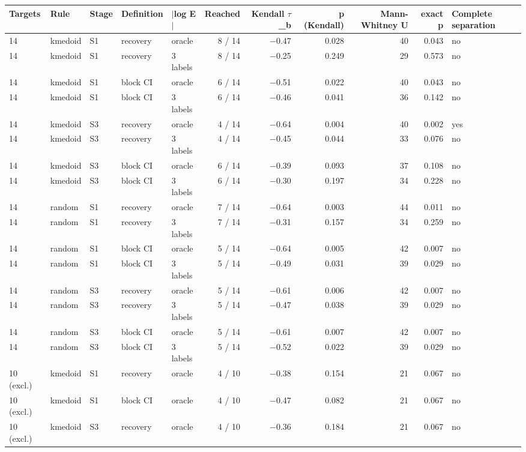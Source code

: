 \begin{tabular}{lllllrrrrrl}
\toprule
Targets & Rule & Stage & Definition & $|$log E$|$ & Reached & Kendall $\tau$\_b & p (Kendall) & Mann-Whitney U & exact p & Complete separation \\
\midrule
14 & kmedoid & S1 & recovery & oracle & 8 / 14 & $-$0.47 & 0.028 & 40 & 0.043 & no \\
14 & kmedoid & S1 & recovery & 3 labels & 8 / 14 & $-$0.25 & 0.249 & 29 & 0.573 & no \\
14 & kmedoid & S1 & block CI & oracle & 6 / 14 & $-$0.51 & 0.022 & 40 & 0.043 & no \\
14 & kmedoid & S1 & block CI & 3 labels & 6 / 14 & $-$0.46 & 0.041 & 36 & 0.142 & no \\
14 & kmedoid & S3 & recovery & oracle & 4 / 14 & $-$0.64 & 0.004 & 40 & 0.002 & yes \\
14 & kmedoid & S3 & recovery & 3 labels & 4 / 14 & $-$0.45 & 0.044 & 33 & 0.076 & no \\
14 & kmedoid & S3 & block CI & oracle & 6 / 14 & $-$0.39 & 0.093 & 37 & 0.108 & no \\
14 & kmedoid & S3 & block CI & 3 labels & 6 / 14 & $-$0.30 & 0.197 & 34 & 0.228 & no \\
14 & random & S1 & recovery & oracle & 7 / 14 & $-$0.64 & 0.003 & 44 & 0.011 & no \\
14 & random & S1 & recovery & 3 labels & 7 / 14 & $-$0.31 & 0.157 & 34 & 0.259 & no \\
14 & random & S1 & block CI & oracle & 5 / 14 & $-$0.64 & 0.005 & 42 & 0.007 & no \\
14 & random & S1 & block CI & 3 labels & 5 / 14 & $-$0.49 & 0.031 & 39 & 0.029 & no \\
14 & random & S3 & recovery & oracle & 5 / 14 & $-$0.61 & 0.006 & 42 & 0.007 & no \\
14 & random & S3 & recovery & 3 labels & 5 / 14 & $-$0.47 & 0.038 & 39 & 0.029 & no \\
14 & random & S3 & block CI & oracle & 5 / 14 & $-$0.61 & 0.007 & 42 & 0.007 & no \\
14 & random & S3 & block CI & 3 labels & 5 / 14 & $-$0.52 & 0.022 & 39 & 0.029 & no \\
10 (excl.) & kmedoid & S1 & recovery & oracle & 4 / 10 & $-$0.38 & 0.154 & 21 & 0.067 & no \\
10 (excl.) & kmedoid & S1 & block CI & oracle & 4 / 10 & $-$0.47 & 0.082 & 21 & 0.067 & no \\
10 (excl.) & kmedoid & S3 & recovery & oracle & 4 / 10 & $-$0.36 & 0.184 & 21 & 0.067 & no \\

\end{tabular}
